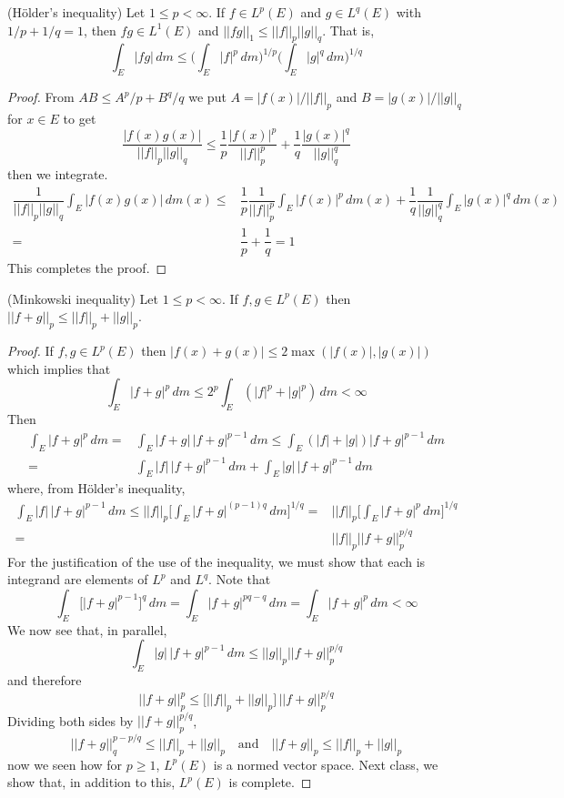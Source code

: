 \vspace{2ex}
\begin{thm}
(H\"{o}lder's inequality) Let $1\leq p<\infty $. If $f\in L^{p}(E)$ and $g\in L^{q}(E)$ with $1/p+1/q=1$, then $fg\in L^{1}(E)$ and $||fg||_{1}\leq ||f||_{p}||g||_{q}$. That is,
\[\int _{E}|fg|\,d m\leq \Big(\int _{E}|f|^{p}\,d m\Big)^{1/p}\Big(\int _{E}|g|^{q}\,d m\Big)^{1/q}\]
\end{thm}
\vspace{2ex}
\begin{proof}
From $AB\leq A^{p}/p+B^{q}/q$ we put $A=|f(x)|/||f||_{p}$ and $B=|g(x)|/||g||_{q}$ for $x\in E$ to get
\[\dfrac{|f(x)g(x)|}{||f||_{p}||g||_{q}}\leq \dfrac{1}{p}\dfrac{|f(x)|^{p}}{||f||^{p}_{p}}+\dfrac{1}{q}\dfrac{|g(x)|^{q}}{||g||^{q}_{q}}\]
then we integrate.
\begin{align*}
\dfrac{1}{||f||_{p}||g||_{q}}\int _{E}|f(x)g(x)|\,d m(x)\leq& \dfrac{1}{p}\dfrac{1}{||f||^{p}_{p}}\int _{E}|f(x)|^{p}\,d m(x)+\dfrac{1}{q}\dfrac{1}{||g||^{q}_{q}}\int _{E}|g(x)|^{q}\,d m(x)\\=&\dfrac{1}{p}+\dfrac{1}{q}=1
\end{align*}
This completes the proof.
\end{proof}
\vspace{2ex}
\begin{thm}
(Minkowski inequality) Let $1\leq p<\infty $. If $f,g\in L^{p}(E)$ then $||f+g||_{p}\leq ||f||_{p}+||g||_{p}$. 
\end{thm}
\vspace{2ex}
\begin{proof}
If $f,g\in L^{p}(E)$ then $|f(x)+g(x)|\leq 2 \max(|f(x)|,|g(x)|)$ which implies that
\[\int _{E}|f+g|^{p}\,d m\leq 2^{p}\int _{E}(|f|^{p}+|g|^{p})\,d m<\infty \]
Then
\begin{align*}
\int _{E}|f+g|^{p}\,d m=&\int _{E}|f+g|\,|f+g|^{p-1}\,d m\leq\int _{E}(|f|+|g|)|f+g|^{p-1}\,d m\\
=&\int _{E}|f|\,|f+g|^{p-1}\,d m+\int _{E}|g|\,|f+g|^{p-1}\,d m
\end{align*}
where, from H\"{o}lder's inequality,
\begin{align*}
\int _{E}|f|\,|f+g|^{p-1}\,d m\leq ||f||_{p}\Big[\int _{E}|f+g|^{(p-1)q}\,d m\Big]^{1/q}=&||f||_{p}\Big[\int _{E}|f+g|^{p}\,d m\Big]^{1/q}\\=&||f||_{p}||f+g||_{p}^{p/q}
\end{align*}
For the justification of the use of the inequality, we must show that each is integrand are elements of $L^{p}$ and $L^{q}$. Note that
\[\int _{E}\Big[|f+g|^{p-1}\Big]^{q}\,d m=\int _{E}|f+g|^{pq-q}\,d m=\int _{E}|f+g|^{p}\,d m<\infty \]
We now see that, in parallel,
\[\int _{E}|g|\,|f+g|^{p-1}\,d m\leq ||g||_{p}||f+g||^{p/q}_{p}\]
and therefore
\[||f+g||^{p}_{p}\leq \Big[||f||_{p}+||g||_{p}\Big]\,||f+g||^{p/q}_{p}\]
Dividing both sides by $||f+g||^{p/q}_{p}$,
\[||f+g||_{q}^{p-p/q}\leq ||f||_{p}+||g||_{p}\quad\mathrm{and}\quad  ||f+g||_{p}\leq ||f||_{p}+||g||_{p}\]
now we seen how for $p\geq 1$, $L^{p}(E)$ is a normed vector space. Next class, we show that, in addition to this, $L^{p}(E)$ is complete.
\end{proof}
\vspace{2ex}


